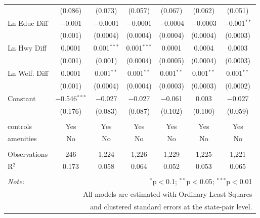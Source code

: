 \begin{table}[!htbp]
\begin{tabular}{@{\extracolsep{5pt}}lcccccc}
  & (0.086) & (0.073) & (0.057) & (0.067) & (0.062) & (0.051) \\ 
  Ln Educ Diff & $-$0.001 & $-$0.0001 & $-$0.0001 & $-$0.0004 & $-$0.0003 & $-$0.001$^{**}$ \\ 
  & (0.001) & (0.0004) & (0.0004) & (0.0004) & (0.0004) & (0.0003) \\ 
  Ln Hwy Diff & 0.0001 & 0.001$^{***}$ & 0.001$^{***}$ & 0.0001 & 0.0004 & 0.0003 \\ 
  & (0.001) & (0.001) & (0.0004) & (0.0005) & (0.0004) & (0.0003) \\ 
  Ln Welf. Diff & 0.0001 & 0.001$^{**}$ & 0.001$^{**}$ & 0.001$^{**}$ & 0.001$^{**}$ & 0.001$^{**}$ \\ 
  & (0.001) & (0.0004) & (0.0004) & (0.0003) & (0.0003) & (0.0002) \\ 
  Constant & $-$0.546$^{***}$ & $-$0.027 & $-$0.027 & $-$0.061 & 0.003 & $-$0.027 \\ 
  & (0.176) & (0.083) & (0.087) & (0.102) & (0.100) & (0.059) \\ 
 \hline \\[-1.8ex] 
controls & Yes & Yes & Yes & Yes & Yes & Yes \\ 
amenities & No & No & No & No & No & No \\ 
\hline \\[-1.8ex] 
Observations & 246 & 1,224 & 1,226 & 1,229 & 1,225 & 1,221 \\ 
R$^{2}$ & 0.173 & 0.058 & 0.064 & 0.052 & 0.053 & 0.065 \\ 
\hline 
\hline \\[-1.8ex] 
\textit{Note:}  & \multicolumn{6}{r}{$^{*}$p$<$0.1; $^{**}$p$<$0.05; $^{***}$p$<$0.01} \\ 
 & \multicolumn{6}{r}{All models are estimated with Ordinary Least Squares} \\ 
 & \multicolumn{6}{r}{and clustered standard errors at the state-pair level.} \\ 
\end{tabular} 
\end{table} 
